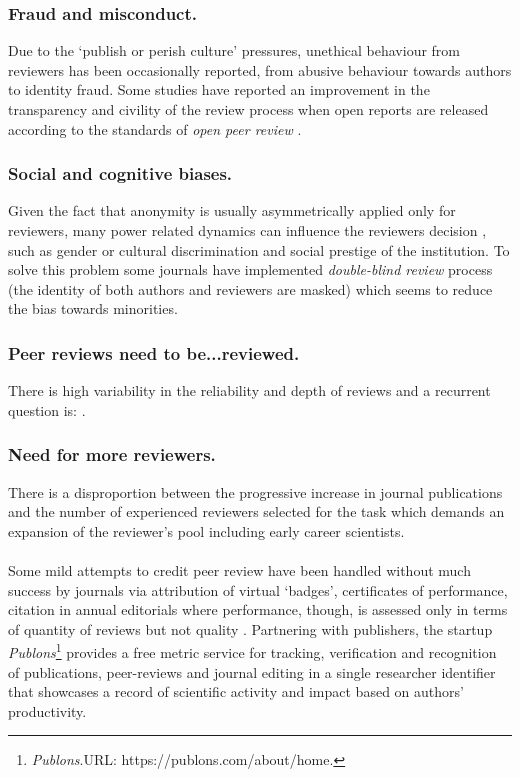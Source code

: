\documentclass[runningheads]{llncs}
\begin{document}
\subsubsection{Fraud and misconduct.} Due to the `publish or perish culture' pressures, unethical behaviour from reviewers has been occasionally reported, from abusive behaviour towards authors \cite{Smith2006,tragedy-reviewers} to identity fraud. Some studies have reported an improvement in the transparency and civility of the review process when open reports are released according to the standards of \emph{open peer review} \cite{PeerRev-NatComm}.
\subsubsection{Social and cognitive biases.} Given the fact that anonymity is usually asymmetrically applied only for reviewers, many power related dynamics can influence the reviewers decision \cite{Tennant2017-F1000R}, such as gender or cultural discrimination and social prestige of the institution. To solve this problem some journals have implemented \emph{double-blind review} process (the identity of both authors and reviewers are masked) which seems to reduce the bias towards minorities.
\subsubsection{Peer reviews need to be...reviewed.} There is high variability in the reliability and depth of reviews and a recurrent question is:  \cite{Tennant2017-F1000R}.
\subsubsection{Need for more reviewers.} There is a disproportion between the progressive increase in journal publications and the number of experienced reviewers selected for the task which demands an expansion of the reviewer's pool including early career scientists\cite{tragedy-reviewers,Warne-RewRev}.
\\
\\
Some mild attempts to credit peer review have been handled without much success by journals via attribution of virtual `badges', certificates of performance, citation in annual editorials \cite{Tennant2017-F1000R} where performance, though, is assessed only in terms of quantity of reviews but not quality \cite{Warne-RewRev}.
\newline Partnering with publishers, the startup \emph{Publons}\footnote[1]{\emph{Publons}.\textsc{URL:} https://publons.com/about/home.} provides a free metric service for tracking, verification and recognition of publications, peer-reviews and journal editing in a single researcher identifier that showcases a record of scientific activity and impact based on authors' productivity.
\end{document}
